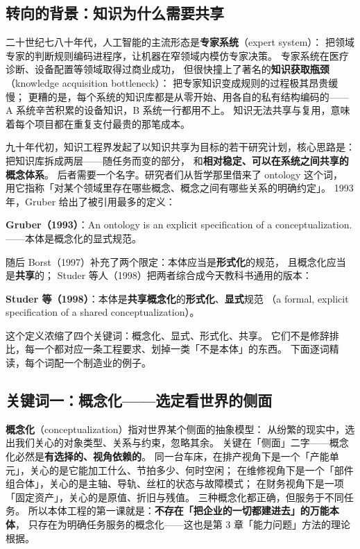 \subsection{转向的背景：知识为什么需要共享}

二十世纪七八十年代，人工智能的主流形态是\textbf{专家系统}（expert system）：
把领域专家的判断规则编码进程序，让机器在窄领域内模仿专家决策。
专家系统在医疗诊断、设备配置等领域取得过商业成功，
但很快撞上了著名的\textbf{知识获取瓶颈}（knowledge acquisition bottleneck）：
把专家知识变成规则的过程极其昂贵缓慢；
更糟的是，每个系统的知识库都是从零开始、用各自的私有结构编码的——
A 系统辛苦积累的设备知识，B 系统一行都用不上。
知识无法共享与复用，意味着每个项目都在重复支付最贵的那笔成本。

九十年代初，知识工程界发起了以知识共享为目标的若干研究计划，核心思路是：
把知识库拆成两层——随任务而变的部分，
和\textbf{相对稳定、可以在系统之间共享的概念体系}。
后者需要一个名字。研究者们从哲学那里借来了 ontology 这个词，
用它指称「对某个领域里存在哪些概念、概念之间有哪些关系的明确约定」。
1993 年，Gruber 给出了被引用最多的定义：

\begin{noteblock}
\textbf{Gruber（1993）}：An ontology is an explicit specification of a conceptualization.
——本体是概念化的显式规范。
\end{noteblock}

随后 Borst（1997）补充了两个限定：本体应当是\textbf{形式化}的规范，
且概念化应当是\textbf{共享}的；
Studer 等人（1998）把两者综合成今天教科书通用的版本：

\begin{noteblock}
\textbf{Studer 等（1998）}：本体是\textbf{共享概念化}的\textbf{形式化}、\textbf{显式}规范
（a formal, explicit specification of a shared conceptualization）。
\end{noteblock}

这个定义浓缩了四个关键词：概念化、显式、形式化、共享。
它们不是修辞排比，每一个都对应一条工程要求、划掉一类「不是本体」的东西。
下面逐词精读，每个词配一个制造业的例子。

\subsection{关键词一：概念化——选定看世界的侧面}

\textbf{概念化}（conceptualization）指对世界某个侧面的抽象模型：
从纷繁的现实中，选出我们关心的对象类型、关系与约束，忽略其余。
关键在「侧面」二字——概念化必然是\textbf{有选择的、视角依赖的}。
同一台车床，在排产视角下是一个「产能单元」，关心的是它能加工什么、节拍多少、何时空闲；
在维修视角下是一个「部件组合体」，关心的是主轴、导轨、丝杠的状态与故障模式；
在财务视角下是一项「固定资产」，关心的是原值、折旧与残值。
三种概念化都正确，但服务于不同任务。
所以本体工程的第一课就是：\textbf{不存在「把企业的一切都建进去」的万能本体}，
只存在为明确任务服务的概念化——这也是第 3 章「能力问题」方法的理论根据。

